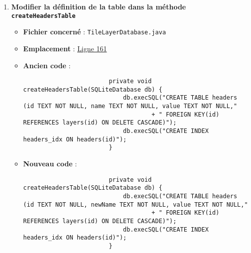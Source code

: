 \begin{enumerate}
    \item \textbf{Modifier la définition de la table dans la méthode \texttt{createHeadersTable}}
          \begin{itemize}
              \item \textbf{Fichier concerné} : \texttt{TileLayerDatabase.java}
              \item \textbf{Emplacement} :
                    \href{https://github.com/MarcusWolschon/osmeditor4android/blob/dcabe8084aa15f5551a37c990516bf73398af1bf/src/main/java/de/blau/android/resources/TileLayerDatabase.java#L161}{Ligne 161}
              \item \textbf{Ancien code} :
                    \begin{verbatim}
                        private void createHeadersTable(SQLiteDatabase db) {
                            db.execSQL("CREATE TABLE headers (id TEXT NOT NULL, name TEXT NOT NULL, value TEXT NOT NULL,"
                                    + " FOREIGN KEY(id) REFERENCES layers(id) ON DELETE CASCADE)");
                            db.execSQL("CREATE INDEX headers_idx ON headers(id)");
                        }
                    \end{verbatim}
              \item \textbf{Nouveau code} :
                    \begin{verbatim}
                        private void createHeadersTable(SQLiteDatabase db) {
                            db.execSQL("CREATE TABLE headers (id TEXT NOT NULL, newName TEXT NOT NULL, value TEXT NOT NULL,"
                                    + " FOREIGN KEY(id) REFERENCES layers(id) ON DELETE CASCADE)");
                            db.execSQL("CREATE INDEX headers_idx ON headers(id)");
                        }
                    \end{verbatim}
          \end{itemize}


\end{enumerate}
